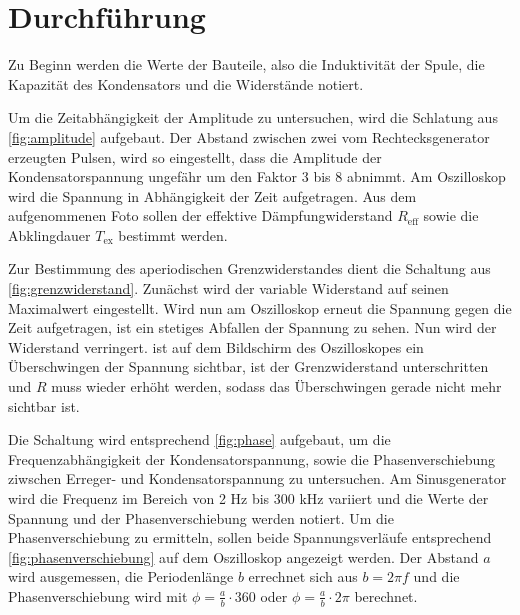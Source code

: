 \section{Durchführung}
\label{sec:durchführung}

Zu Beginn werden die Werte der Bauteile, also die Induktivität der Spule, die Kapazität des Kondensators und die Widerstände notiert.


Um die Zeitabhängigkeit der Amplitude zu untersuchen, wird die Schlatung aus \ref{fig:amplitude} aufgebaut. Der Abstand zwischen zwei vom Rechtecksgenerator erzeugten Pulsen, wird so eingestellt, dass die Amplitude der Kondensatorspannung ungefähr um den Faktor 3 bis 8 abnimmt. Am Oszilloskop wird die Spannung in Abhängigkeit der Zeit aufgetragen. Aus dem aufgenommenen Foto sollen der effektive Dämpfungwiderstand $R_\mathrm{eff}$ sowie die Abklingdauer $T_\mathrm{ex}$ bestimmt werden.


Zur Bestimmung des aperiodischen Grenzwiderstandes dient die Schaltung aus \ref{fig:grenzwiderstand}. Zunächst wird der variable Widerstand auf seinen Maximalwert eingestellt. Wird nun am Oszilloskop erneut die Spannung gegen die Zeit aufgetragen, ist ein stetiges Abfallen der Spannung zu sehen. Nun wird der Widerstand verringert. ist auf dem Bildschirm des Oszilloskopes ein Überschwingen der Spannung sichtbar, ist der Grenzwiderstand unterschritten und $R$ muss wieder erhöht werden, sodass das Überschwingen gerade nicht mehr sichtbar ist.


Die Schaltung wird entsprechend \ref{fig:phase} aufgebaut, um die Frequenzabhängigkeit der Kondensatorspannung, sowie die Phasenverschiebung ziwschen Erreger- und Kondensatorspannung zu untersuchen. Am Sinusgenerator wird die Frequenz im Bereich von 2 \si{\Hz} bis 300 \si{\kilo\Hz} variiert und die Werte der Spannung und der Phasenverschiebung werden notiert. Um die Phasenverschiebung zu ermitteln, sollen beide Spannungsverläufe entsprechend \ref{fig:phasenverschiebung} auf dem Oszilloskop angezeigt werden. Der Abstand $a$ wird ausgemessen, die Periodenlänge $b$ errechnet sich aus $b = 2\pi f$ und die Phasenverschiebung wird mit $\phi = \frac{a}{b} \cdot 360$ oder $\phi = \frac{a}{b} \cdot 2\pi $ berechnet.

